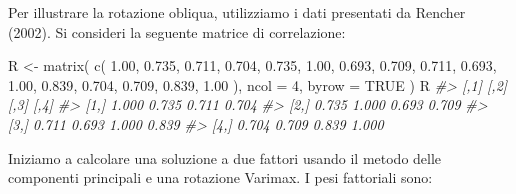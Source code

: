\documentclass[
  11pt,
]{krantz}
\makeatletter
\newenvironment{Shaded}{\begin{snugshade}}{\end{snugshade}}
\newcommand{\AttributeTok}[1]{\textcolor[rgb]{0.61,0.61,0.61}{#1}}
\newcommand{\CommentTok}[1]{\textcolor[rgb]{0.37,0.37,0.37}{\textit{#1}}}
\newcommand{\ConstantTok}[1]{\textcolor[rgb]{0,0,0}{#1}}
\newcommand{\DecValTok}[1]{\textcolor[rgb]{0.06,0.06,0.06}{#1}}
\newcommand{\FloatTok}[1]{\textcolor[rgb]{0.06,0.06,0.06}{#1}}
\newcommand{\FunctionTok}[1]{\textcolor[rgb]{0,0,0}{#1}}
\newcommand{\NormalTok}[1]{#1}
\newcommand{\OtherTok}[1]{\textcolor[rgb]{0.37,0.37,0.37}{#1}}
\newenvironment{kframe}{%
\medskip{}
\setlength{\fboxsep}{.8em}
 \def\at@end@of@kframe{}%
 \ifinner\ifhmode%
  \def\at@end@of@kframe{\end{minipage}}%
  \begin{minipage}{\columnwidth}%
 \fi\fi%
 \def\FrameCommand##1{\hskip\@totalleftmargin \hskip-\fboxsep
 \colorbox{shadecolor}{##1}\hskip-\fboxsep
     \hskip-\linewidth \hskip-\@totalleftmargin \hskip\columnwidth}%
 \MakeFramed {\advance\hsize-\width
   \@totalleftmargin\z@ \linewidth\hsize
   \@setminipage}}%
 {\par\unskip\endMakeFramed%
 \at@end@of@kframe}
\renewenvironment{Shaded}{\begin{kframe}}{\end{kframe}}
\theoremstyle{definition}
\theoremstyle{definition}
\theoremstyle{definition}
\theoremstyle{definition}
\theoremstyle{remark}
\makeatother
\begin{document}
Per illustrare la rotazione obliqua, utilizziamo i dati presentati da Rencher (2002). Si consideri la seguente matrice di correlazione:

\begin{Shaded}
\begin{Highlighting}[]
\NormalTok{R }\OtherTok{\textless{}{-}} \FunctionTok{matrix}\NormalTok{(}
  \FunctionTok{c}\NormalTok{(}
    \FloatTok{1.00}\NormalTok{,  }\FloatTok{0.735}\NormalTok{, }\FloatTok{0.711}\NormalTok{, }\FloatTok{0.704}\NormalTok{,}
    \FloatTok{0.735}\NormalTok{, }\FloatTok{1.00}\NormalTok{,  }\FloatTok{0.693}\NormalTok{, }\FloatTok{0.709}\NormalTok{,}
    \FloatTok{0.711}\NormalTok{, }\FloatTok{0.693}\NormalTok{, }\FloatTok{1.00}\NormalTok{,  }\FloatTok{0.839}\NormalTok{,}
    \FloatTok{0.704}\NormalTok{, }\FloatTok{0.709}\NormalTok{, }\FloatTok{0.839}\NormalTok{, }\FloatTok{1.00}
\NormalTok{  ),}
  \AttributeTok{ncol =} \DecValTok{4}\NormalTok{,}
  \AttributeTok{byrow =} \ConstantTok{TRUE}
\NormalTok{)}
\NormalTok{R}
\CommentTok{\#\textgreater{}       [,1]  [,2]  [,3]  [,4]}
\CommentTok{\#\textgreater{} [1,] 1.000 0.735 0.711 0.704}
\CommentTok{\#\textgreater{} [2,] 0.735 1.000 0.693 0.709}
\CommentTok{\#\textgreater{} [3,] 0.711 0.693 1.000 0.839}
\CommentTok{\#\textgreater{} [4,] 0.704 0.709 0.839 1.000}
\end{Highlighting}
\end{Shaded}

Iniziamo a calcolare una soluzione a due fattori usando il metodo delle componenti principali e una rotazione Varimax. I pesi fattoriali sono:
\end{document}

